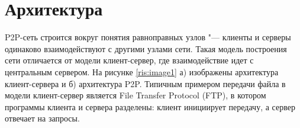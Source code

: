 \documentclass[bachelor, och, coursework]{SCWorks}
\begin{document}
\section{Архитектура} %
P2P-сеть строится вокруг понятия равноправных узлов "--- клиенты и серверы одинаково взаимодействуют с другими узлами сети. 
Такая модель построения сети отличается от модели клиент-сервер, где взаимодействие идет с центральным сервером. 
На рисунке \ref{ris:image1} а) изображены архитектура клиент-сервера и б) архитектура P2P. 
Типичным примером передачи файла в модели клиент-сервер является File Transfer Protocol (FTP), 
в котором программы клиента и сервера разделены: клиент инициирует передачу, а сервер отвечает на запросы. 

\begin{figure}[h]
    \begin{minipage}[h]{0.49\linewidth}
    \end{minipage}
    \hfill
    \begin{minipage}[h]{0.49\linewidth}

\end{minipage}
\end{figure}
\end{document}
